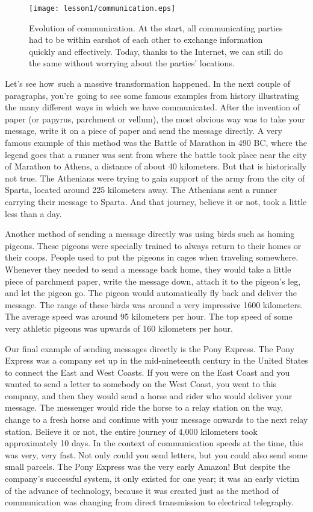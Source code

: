\begin{figure}[h]
    \centering
    \texttt{[image: lesson1/communication.eps]}
    \caption[Evolution of communication]{Evolution of communication. At the start, all communicating parties had to be within earshot of each other to exchange information quickly and effectively. Today, thanks to the Internet, we can still do the same without worrying about the parties' locations.}
    \label{fig:1-1_communication}
\end{figure}

Let's see how such a massive transformation happened.
In the next couple of paragraphs, you're going to see some famous examples from history illustrating the many different ways in which we have communicated.
After the invention of paper (or papyrus, parchment or vellum), the most obvious way was to take your message, write it on a piece of paper and send the message directly.
A very famous example of this method was the Battle of Marathon in 490 BC, where the legend goes that a runner was sent from where the battle took place near the city of Marathon to Athens, a distance of about 40 kilometers.
But that is historically not true.
The Athenians were trying to gain support of the army from the city of Sparta, located around 225 kilometers away.
The Athenians sent a runner carrying their message to Sparta.
And that journey, believe it or not, took a little less than a day.

Another method of sending a message directly was using birds such as homing pigeons.
These pigeons were specially trained to always return to their homes or their coops. People used to put the pigeons in cages when traveling somewhere. Whenever they needed to send a message back home, they would take a little piece of parchment paper, write the message down, attach it to the pigeon's leg, and let the pigeon go. The pigeon would automatically fly back and deliver the message.
The range of these birds was around a very impressive 1600 kilometers.
The average speed was around 95 kilometers per hour.
The top speed of some very athletic pigeons was upwards of 160 kilometers per hour.

Our final example of sending messages directly is the Pony Express.
The Pony Express was a company set up in the mid-nineteenth century in the United States to connect the East and West Coasts.
If you were on the East Coast and you wanted to send a letter to somebody on the West Coast, you went to this company, and then they would send a horse and rider who would deliver your message.
The messenger would ride the horse to a relay station on the way, change to a fresh horse and continue with your message onwards to the next relay station.
Believe it or not, the entire journey of 4,000 kilometers took approximately 10 days.
In the context of communication speeds at the time, this was very, very fast.
Not only could you send letters, but you could also send some small parcels.
The Pony Express was the very early Amazon!
But despite the company's successful system, it only existed for one year; it was an early victim of the advance of technology, because it was created just as the method of communication was changing from direct transmission to electrical telegraphy.


